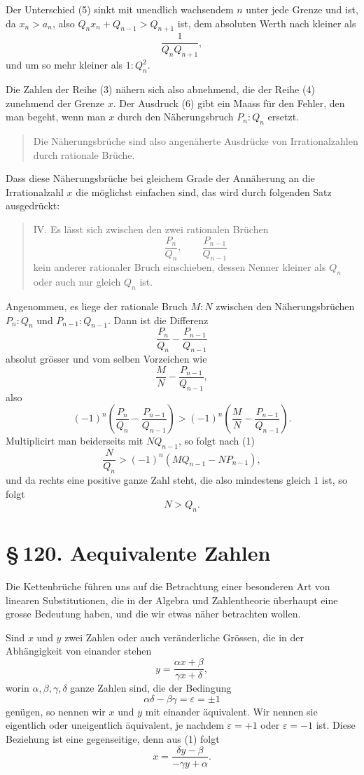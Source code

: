 \documentclass[11pt]{article}
\providecommand{\sect}[2]{\section*{\S\,#1. #2}}
\begin{document}
Der Unterschied (5) sinkt mit unendlich wachsendem $n$ unter jede Grenze und ist, da $x_n>a_n$, also $Q_nx_n+Q_{n-1}>Q_{n+1}$ ist, dem absoluten Werth nach kleiner als
\[
\tag{6}        \frac1{Q_nQ_{n+1}},
\]
und um so mehr kleiner als $1:Q_n^2$.

Die Zahlen der Reihe (3) nähern sich also abnehmend, die der Reihe (4) zunehmend der Grenze $x$. Der Ausdruck (6) gibt ein Maass für den Fehler, den man begeht, wenn man $x$ durch den Näherungsbruch $P_n:Q_n$ ersetzt.

\begin{quote}
Die Näherungsbrüche sind also angenäherte Ausdrücke von Irrationalzahlen durch rationale Brüche.
\end{quote}

Dass diese Näherungsbrüche bei gleichem Grade der Annäherung an die Irrationalzahl $x$ die möglichst einfachen sind, das wird durch folgenden Satz ausgedrückt:

\begin{quote}
IV. Es lässt sich zwischen den zwei rationalen Brüchen
\[
        \frac{P_n}{Q_n},\qquad \frac{P_{n-1}}{Q_{n-1}}
\]
kein anderer rationaler Bruch einschieben, dessen Nenner kleiner als $Q_n$ oder auch nur gleich $Q_n$ ist.
\end{quote}

Angenommen, es liege der rationale Bruch $M:N$ zwischen den Näherungsbrüchen $P_n:Q_n$ und $P_{n-1}:Q_{n-1}$. Dann ist die Differenz
\[
        \frac{P_n}{Q_n}-\frac{P_{n-1}}{Q_{n-1}}
\]
absolut grösser und vom selben Vorzeichen wie
\[
        \frac{M}{N}-\frac{P_{n-1}}{Q_{n-1}},
\]
also
\[
        (-1)^n\left(\frac{P_n}{Q_n}-\frac{P_{n-1}}{Q_{n-1}}\right)
        >(-1)^n\left(\frac{M}{N}-\frac{P_{n-1}}{Q_{n-1}}\right).
\]
Multiplicirt man beiderseits mit $NQ_{n-1}$, so folgt nach (1)
\[
        \frac{N}{Q_n}>(-1)^n(MQ_{n-1}-NP_{n-1}),
\]
und da rechts eine positive ganze Zahl steht, die also mindestens gleich $1$ ist, so folgt
\[
        N>Q_n.
\]

\sect{120}{Aequivalente Zahlen}

Die Kettenbrüche führen uns auf die Betrachtung einer besonderen Art von linearen Substitutionen, die in der Algebra und Zahlentheorie überhaupt eine grosse Bedeutung haben, und die wir etwas näher betrachten wollen.

Sind $x$ und $y$ zwei Zahlen oder auch veränderliche Grössen, die in der Abhängigkeit von einander stehen
\[
\tag{1}        y=\frac{\alpha x+\beta}{\gamma x+\delta},
\]
worin $\alpha,\beta,\gamma,\delta$ ganze Zahlen sind, die der Bedingung
\[
\tag{2}        \alpha\delta-\beta\gamma=\varepsilon=\pm1
\]
genügen, so nennen wir $x$ und $y$ mit einander äquivalent. Wir nennen sie eigentlich oder uneigentlich äquivalent, je nachdem $\varepsilon=+1$ oder $\varepsilon=-1$ ist. Diese Beziehung ist eine gegenseitige, denn aus (1) folgt
\[
\tag{3}        x=\frac{\delta y-\beta}{-\gamma y+\alpha}.
\]
\end{document}
